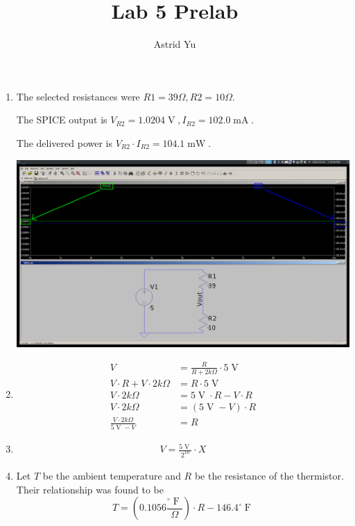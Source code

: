 \documentclass[12pt]{article}
\author{Astrid Yu}
\title{Lab 5 Prelab}
\DeclareMathOperator{\V}{V}
\DeclareMathOperator{\F}{F}
\DeclareMathOperator{\mA}{mA}
\DeclareMathOperator{\mW}{mW}
\begin{document}
\maketitle

\begin{enumerate}
    \item The selected resistances were $R1 = 39\Omega, R2=10\Omega$.
    
        The SPICE output is $V_{R2} = 1.0204\V, I_{R2} = 102.0\mA$.
        
        The delivered power is $V_{R2}\cdot I_{R2} = 104.1\mW$.
    
        \includegraphics[width=1\linewidth]{lab5pre1.png}

    \item \begin{equation}
        \begin{aligned}
            V &= \frac{R}{R + 2k\Omega}\cdot 5\V \\
            V \cdot R + V \cdot 2k\Omega &= R\cdot 5\V \\
            V \cdot 2k\Omega &= 5\V \cdot R - V \cdot R \\
            V \cdot 2k\Omega &= (5\V - V) \cdot R \\
            \frac{V \cdot 2k\Omega}{5\V - V} &= R
        \end{aligned}
    \end{equation}
    \item \begin{equation}
        \begin{aligned}
            V = \frac{5\V}{2^{10}}\cdot X
        \end{aligned}
    \end{equation}
    \item Let $T$ be the ambient temperature and $R$ be the resistance of the thermistor. Their relationship was found 
        to be
        \begin{equation}
            T=(0.1056\frac{^\circ \F}{\Omega}) \cdot R -146.4 ^\circ\F
        \end{equation}


\end{enumerate}
\end{document}
